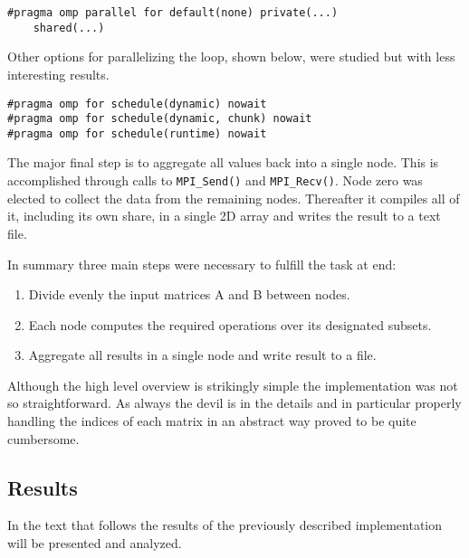 \begin{lstlisting}
#pragma omp parallel for default(none) private(...)
	shared(...)
\end{lstlisting}

Other options for parallelizing the loop, shown below, were studied but with less interesting results.

\begin{lstlisting}
#pragma omp for schedule(dynamic) nowait
#pragma omp for schedule(dynamic, chunk) nowait
#pragma omp for schedule(runtime) nowait
\end{lstlisting}

The major final step is to aggregate all values back into a single node. This is accomplished through calls to \texttt{MPI\_Send()} and \texttt{MPI\_Recv()}.
Node zero was elected to collect the data from the remaining nodes. Thereafter it compiles all of it, including its own share, in a single 2D array and writes the result to a text file.

In summary three main steps were necessary to fulfill the task at end:
\begin{enumerate}
\item Divide evenly the input matrices A and B between nodes.
\item Each node computes the required operations over its designated subsets.
\item Aggregate all results in a single node and write result to a file.
\end{enumerate}

Although the high level overview is strikingly simple the implementation was not so straightforward. As always the devil is in the details and in particular properly handling the indices of each matrix in an abstract way proved to be quite cumbersome.

\subsection{Results}
\label{ssec:results}

In the text that follows the results of the previously described implementation will be presented and analyzed.

